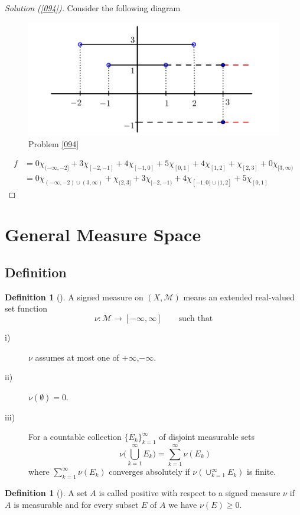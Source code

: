 \documentclass[	DIV=calc,paper=a4,fontsize=11pt]{scrartcl}	 	%
\theoremstyle{definition}
\newtheorem{defn}[thm]{Definition}
\theoremstyle{plain}
\theoremstyle{remark}
\begin{document}
\newpage
\begin{proof}[Solution (\ref{094})]
Consider the following diagram
\begin{figure}[hbt!]
\centering
\includegraphics[width=.5\textwidth]{lebesgue-problem.png}
\caption{Problem \ref{094}}\label{fig094}
\end{figure}

\begin{align*}
f&=0\chi_{(-\infty,-2]}+3\chi_{[-2,-1]}+4\chi_{[-1,0]}+5\chi_{[0,1]}+4\chi_{[1,2]}+\chi_{[2,3]}+0\chi_{[3,\infty)}\\
 &=0\chi_{(-\infty,-2)\cup (3,\infty)}+\chi_{(2,3]}+3\chi_{[-2,-1)}+4\chi_{[-1,0)\cup (1,2]}+5\chi_{[0,1]}
\end{align*}
\end{proof}

\newpage
\section{General Measure Space}

\subsection{Definition}

\begin{defn}[\textbf{\color{blue}{Signed Measure}}]
A signed measure on $(X,\mathcal{M})$ means an extended real-valued set function
\[\nu: \mathcal{M}\to [-\infty,\infty]\qquad \mbox{such that}\]
\begin{description}
  \item[i)] $\nu$ assumes at most one of $+\infty$,$-\infty$.
  \item[ii)] $\nu(\emptyset)=0$.
  \item[iii)] For a countable collection $\{E_k\}_{k=1}^{\infty}$ of disjoint measurable sets
  \[\nu\biggl(\bigcup_{k=1}^{\infty}E_k\biggl)=\sum_{k=1}^{\infty}\nu(E_k)\]
  where $\sum_{k=1}^{\infty}\nu(E_k)$ converges absolutely if $\nu(\cup_{k=1}^{\infty}E_k)$ is finite.
\end{description}
\end{defn}

\begin{defn}[\textbf{\color{blue}{Positive Set}}]
A set $A$ is called positive with respect to a signed measure $\nu$ if $A$ is measurable and for every subset $E$ of $A$ we have $\nu(E)\geq 0$.
\end{defn}
\end{document}

